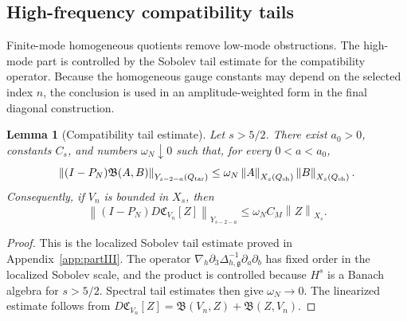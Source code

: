 \documentclass[11pt]{article}
\numberwithin{equation}{section}
\theoremstyle{plain}
\newtheorem{lemma}{Lemma}[section]
\theoremstyle{definition}
\theoremstyle{remark}
\newcommand{\nabh}{\nabla_h}
\newcommand{\norm}[2]{\left\|#1\right\|_{#2}}
\newcommand{\calB}{\mathfrak B}
\newcommand{\calC}{\mathfrak C}
\begin{document}
\subsection{High-frequency compatibility tails}
\label{pIV:sec:tails}

Finite-mode homogeneous quotients remove low-mode obstructions.  The high-mode part is
controlled by the Sobolev tail estimate for the compatibility operator.  Because the
homogeneous gauge constants may depend on the selected index \(n\), the conclusion is
used in an amplitude-weighted form in the final diagonal construction.

\begin{lemma}[Compatibility tail estimate]\label{pIV:lem:compat-tail}
Let \(s>5/2\).  There exist \(a_0>0\), constants \(C_s\), and numbers
\(\omega_N\downarrow0\) such that, for every \(0<a<a_0\),
\begin{equation}\label{pIV:eq:B-tail}
        \norm{(I-P_N)\calB(A,B)}{Y_{s-2-a}(Q_{\rm tar})}
        \le \omega_N
        \norm{A}{X_s(Q_{\rm sh})}
        \norm{B}{X_s(Q_{\rm sh})}.
\end{equation}
Consequently, if \(V_n\) is bounded in \(X_s\), then
\begin{equation}\label{pIV:eq:linear-tail}
        \norm{(I-P_N)D\calC_{V_n}[Z]}{Y_{s-2-a}}
        \le \omega_N C_M\norm{Z}{X_s}.
\end{equation}
\end{lemma}

\begin{proof}
This is the localized Sobolev tail estimate proved in Appendix~\ref{app:partIII}.  The operator
\(\nabh\partial_3\Delta_{h,\mathfrak g}^{-1}\partial_a\partial_b\) has fixed order in the localized
Sobolev scale, and the product is controlled because \(H^s\) is a Banach algebra for
\(s>5/2\).  Spectral tail estimates then give \(\omega_N\to0\).  The linearized
estimate follows from
\(D\calC_{V_n}[Z]=\calB(V_n,Z)+\calB(Z,V_n)\).
\end{proof}
\end{document}
